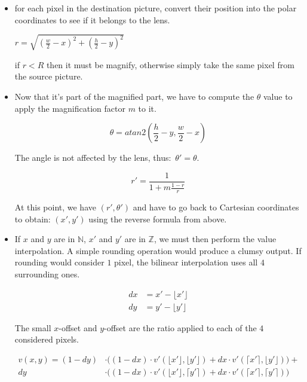 \documentclass[10pt,a4paper]{article}
\begin{document}
\begin{itemize}
    \item for each pixel in the destination picture, convert their position
    into the polar coordinates to see if it belongs to the lens.

    $r = \sqrt{(\frac{w}{2}-x)^2 + (\frac{h}{2}-y)^2}$

    if $r < R$ then it must be magnify, otherwise simply take the same pixel
    from the source picture.

    \item Now that it's part of the magnified part, we have to compute the
    $\theta$ value to apply the magnification factor $m$ to it.

    $$\theta = atan2(\frac{h}{2} - y, \frac{w}{2} - x)$$

    The angle is not affected by the lens, thus: $\theta\prime = \theta$.

    $$r\prime = \frac{1}{1 + m\frac{1-r}{r}}$$

    At this point, we have $(r\prime, \theta\prime)$ and have to go back to
    Cartesian coordinates to obtain: $(x\prime, y\prime)$ using the reverse
    formula from above.

    \item If $x$ and $y$ are in $\mathbb{N}$, $x\prime$ and $y\prime$ are in
    $\mathbb{Z}$, we must then perform the value interpolation. A simple
    rounding operation would produce a clumsy output. If rounding would
    consider $1$ pixel, the bilinear interpolation uses all $4$ surrounding
    ones.

    \begin{align}
    dx &= x\prime - \lfloor{}x\prime\rfloor{} \\
    dy &= y\prime - \lfloor{}y\prime\rfloor{}
    \end{align}

    The small $x$-offset and $y$-offset are the ratio applied to each of the
    $4$ considered pixels.

    \begin{align*}
    v(x, y) =
    (1-dy) &\cdot \big(
        (1-dx) \cdot v\prime(\lfloor{}x\prime\rfloor{},\lfloor{}y\prime\rfloor{}) +
        dx \cdot v\prime(\lceil{}x\prime\rceil{},\lfloor{}y\prime\rfloor{})
    \big) + \\
    dy &\cdot \big(
        (1-dx) \cdot v\prime(\lfloor{}x\prime\rfloor{},\lceil{}y\prime\rceil{}) +
        dx \cdot v\prime(\lceil{}x\prime\rceil{},\lceil{}y\prime\rceil{})
    \big)
    \end{align*}

\end{itemize}
\end{document}
